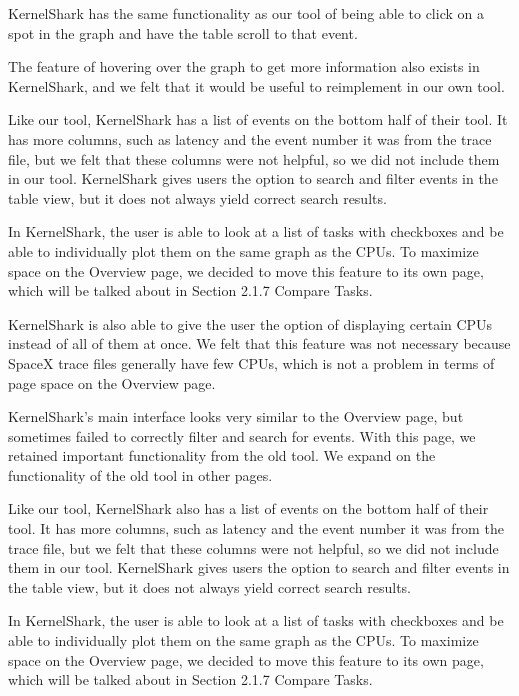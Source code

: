 \documentclass{hmcclinic}
\begin{document}
  KernelShark has the same functionality as our tool of being able to click on a
  spot in the graph and have the table scroll to that event. 
    
  The feature of hovering over the graph to get more information also exists in
  KernelShark, and we felt that it would be useful to reimplement in our own
  tool.

  Like our tool, KernelShark has a list of events on the bottom half of
  their tool.  It has more columns, such as latency and the event number it was
  from the trace file, but we felt that these columns were not helpful, so we
  did not include them in our tool. KernelShark gives users the option to search
  and filter events in the table view, but it does not always yield correct
  search results. 

  In KernelShark, the user is able to look at a list of tasks with checkboxes
  and be able to individually plot them on the same graph as the CPUs. To
  maximize space on the Overview page, we decided to move this feature to its
  own page, which will be talked about in Section 2.1.7 Compare Tasks. 

  KernelShark is also able to give the user the option of displaying certain
  CPUs instead of all of them at once. We felt that this feature was not
  necessary because SpaceX trace files generally have few CPUs, which is not a
  problem in terms of page space on the Overview page.

  KernelShark's main interface looks very similar to the Overview page, but
  sometimes failed to correctly filter and search for events. With this page,
  we retained important functionality from the old tool. We expand on the
  functionality of the old tool in other pages.

     Like our tool, KernelShark also has a list of events on the bottom half of their tool. 
     It has more columns, such as latency and the event number it was from the trace file, 
     but we felt that these columns were not helpful, so we did not include them
     in our tool. KernelShark gives users the option to search and filter events in the table view, but it does not always yield correct search results. 
    
    In KernelShark, the user is able to look at a list of tasks with checkboxes and be able to individually plot them on the same graph as the CPUs. To maximize space on the Overview page, we decided to move this feature to its own page, which will be talked about in Section 2.1.7 Compare Tasks. 
    
\end{document}
